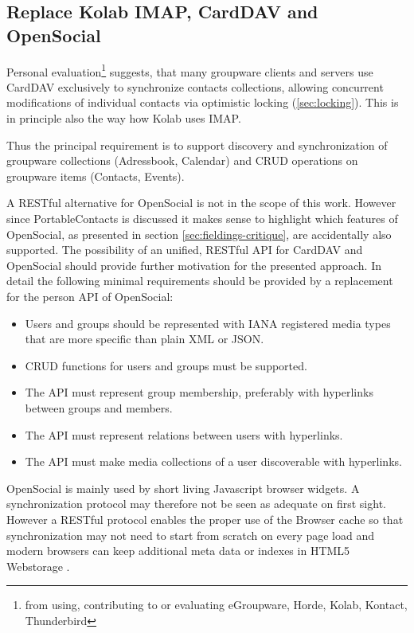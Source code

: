 \documentclass[11pt,a4paper,headsepline,twoside]{scrartcl}		%
\begin{document}


\subsection{Replace Kolab IMAP, CardDAV and OpenSocial}
\label{sec:replacement-carddav}

Personal evaluation\footnote{from using, contributing to or evaluating
  eGroupware, Horde, Kolab, Kontact, Thunderbird} suggests, that many groupware
clients and servers use CardDAV exclusively to synchronize contacts collections,
allowing concurrent modifications of individual contacts via optimistic locking
(\autoref{sec:locking}). This is in principle also the way how Kolab uses IMAP.

Thus the principal requirement is to support discovery and synchronization of
groupware collections (Adressbook, Calendar) and CRUD operations on groupware
items (Contacts, Events).

A RESTful alternative for OpenSocial is not in the scope of this work. However
since PortableContacts is discussed it makes sense to highlight which features
of OpenSocial, as presented in section \ref{sec:fieldings-critique}, are
accidentally also supported. The possibility of an unified, RESTful API for
CardDAV and OpenSocial should provide further motivation for the presented
approach. In detail the following minimal requirements should be provided by a
replacement for the person API of OpenSocial:

\begin{itemize}
\item Users and groups should be represented with IANA registered media types
  that are more specific than plain XML or JSON.
\item CRUD functions for users and groups must be supported.
\item The API must represent group membership, preferably with hyperlinks
  between groups and members.
\item The API must represent relations between users with hyperlinks.
\item The API must make media collections of a user discoverable with
  hyperlinks.
\end{itemize}

OpenSocial is mainly used by short living Javascript browser widgets. A
synchronization protocol may therefore not be seen as adequate on first
sight. However a RESTful protocol enables the proper use of the Browser cache so
that synchronization may not need to start from scratch on every page load and
modern browsers can keep additional meta data or indexes in HTML5
Webstorage \cite{Hickson2011b}.
\end{document}
